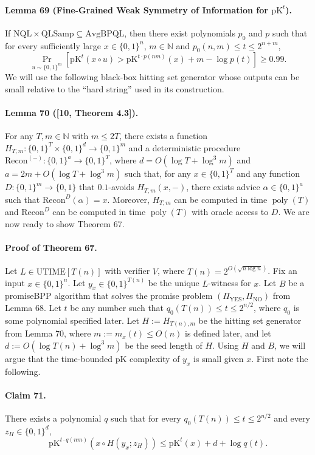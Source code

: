 \documentclass[10pt,a4paper]{article}
\begin{document}
\paragraph{Lemma 69 (Fine-Grained Weak Symmetry of Information for $\mathrm{pK}^t$).} If $\mathrm{NQL}\times\mathrm{QLSamp}\subseteq\mathrm{AvgBPQL}$, then there exist polynomials $p_0$ and $p$ such that for every sufficiently large $x\in\{0,1\}^n$, $m\in\mathbb N$ and $p_0(n,m)\leq t\leq2^{n+m}$,
\[\Pr_{u\sim\{0,1\}^m}[\mathrm{pK}^t(x\circ u)>\mathrm{pK}^{t\cdot p(nm)}(x)+m-\log p(t)]\geq0.99.\]
We will use the following black-box hitting set generator whose outputs can be small relative to the ``hard string'' used in its construction.
\paragraph{Lemma 70 ([10, Theorem 4.3]).} For any $T,m\in\mathbb N$ with $m\leq2T$, there exists a function $H_{T,m}:\{0,1\}^T\times\{0,1\}^d\to\{0,1\}^m$ and a deterministic procedure $\mathrm{Recon}^{(-)}:\{0,1\}^a\to\{0,1\}^T$, where $d=O(\log T+\log^3m)$ and $a=2m+O(\log T+\log^3m)$ such that, for any $x\in\{0,1\}^T$ and any function $D:\{0,1\}^m\to\{0,1\}$ that $0.1$-avoids $H_{T,m}(x,-)$, there exists advice $\alpha\in\{0,1\}^a$ such that $\mathrm{Recon}^D(\alpha)=x$. Moreover, $H_{T,m}$ can be computed in time $\operatorname{poly}(T)$ and $\mathrm{Recon}^D$ can be computed in time $\operatorname{poly}(T)$ with oracle access to $D$.
We are now ready to show Theorem 67.
\paragraph{Proof of Theorem 67.} Let $L\in\mathrm{UTIME}[T(n)]$ with verifier $V$, where $T(n)=2^{O(\sqrt{n\log n})}$. Fix an input $x\in\{0,1\}^n$. Let $y_x\in\{0,1\}^{T(n)}$ be the unique $L$-witness for $x$. Let $B$ be a promiseBPP algorithm that solves the promise problem $(\Pi_{\mathrm{YES}},\Pi_{\mathrm{NO}})$ from Lemma 68.
Let $t$ be any number such that $q_0(T(n))\leq t\leq2^{n/2}$, where $q_0$ is some polynomial specified later. Let $H:=H_{T(n),m}$ be the hitting set generator from Lemma 70, where $m:=m_x(t)\leq O(n)$ is defined later, and let $d:=O(\log T(n)+\log^3m)$ be the seed length of $H$.
Using $H$ and $B$, we will argue that the time-bounded pK complexity of $y_x$ is small given $x$. First note the following.
\paragraph{Claim 71.} There exists a polynomial $q$ such that for every $q_0(T(n))\leq t\leq2^{n/2}$ and every $z_H\in\{0,1\}^d$,
\[\mathrm{pK}^{t\cdot q(nm)}(x\circ H(y_x;z_H))\leq\mathrm{pK}^t(x)+d+\log q(t).\]
\end{document}
